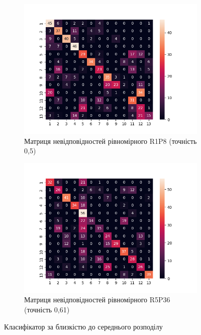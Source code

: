 \begin{figure}[h]
    \begin{subfigure}{0.5\textwidth}
    \includegraphics[width=0.95\linewidth]{img/confusion/hist_R1_P8_u.png}
    \caption{
        Матриця невідповідностей рівномірного R1P8 (точність 0,5)
    }
    \end{subfigure}%
    \begin{subfigure}{0.5\textwidth}
    \includegraphics[width=0.95\linewidth]{img/confusion/hist_R5_P36_u.png}
    \caption{
        Матриця невідповідностей рівномірного R5P36 (точність 0,61) 
    }
    \end{subfigure}%
    
    \caption{Класифікатор за близкістю до середнього розподілу}
    \label{fig:precision-1}
\end{figure}

